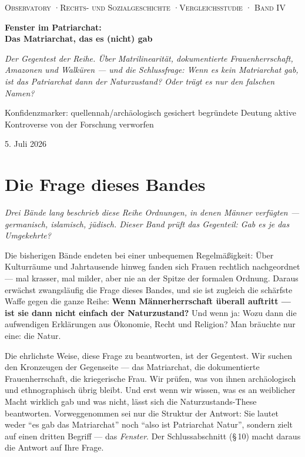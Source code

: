 \documentclass[11pt,a4paper,ngerman]{scrartcl}
\newcommand{\chipbase}[2]{\hspace{0pt}{\footnotesize\textcolor{#1}{[\textsc{#2}]}}}
\newcommand{\chipbelegt}[1]{\chipbase{chipgreen}{#1}}
\newcommand{\chipplausibel}[1]{\chipbase{chipamber}{#1}}
\newcommand{\chipumstritten}[1]{\chipbase{chipred}{#1}}
\newcommand{\chipthese}[1]{\chipbase{chipblue}{#1}}
\begin{document}
\begin{titlepage}
\centering
{\footnotesize\scshape Observatory \quad·\quad Rechts- und Sozialgeschichte \quad·\quad Vergleichsstudie · Band IV\par}
\vspace{2.5cm}
{\Huge\bfseries Fenster im Patriarchat:\\Das Matriarchat, das es (nicht) gab\par}
\vspace{1.2cm}
{\large\itshape Der Gegentest der Reihe. Über Matrilinearität, dokumentierte Frauenherrschaft, Amazonen und Walküren --- und die Schlussfrage: Wenn es kein Matriarchat gab, ist das Patriarchat dann der Naturzustand? Oder trägt es nur den falschen Namen?\par}
\vfill
{\small Konfidenzmarker: \chipbelegt{belegt} quellennah/archäologisch gesichert \quad \chipplausibel{plausibel} begründete Deutung \quad \chipumstritten{umstritten} aktive Kontroverse \quad \chipthese{widerlegt} von der Forschung verworfen\par}
\vspace{1cm}
{\large 5. Juli 2026\par}
\end{titlepage}
\tableofcontents
\clearpage

\section{Die Frage dieses Bandes}
\noindent\textit{Drei Bände lang beschrieb diese Reihe Ordnungen, in denen Männer verfügten --- germanisch, islamisch, jüdisch. Dieser Band prüft das Gegenteil: Gab es je das Umgekehrte?}
\medskip

Die bisherigen Bände endeten bei einer unbequemen Regelmäßigkeit: Über Kulturräume und Jahrtausende hinweg fanden sich Frauen rechtlich nachgeordnet --- mal krasser, mal milder, aber nie an der Spitze der formalen Ordnung. Daraus erwächst zwangsläufig die Frage dieses Bandes, und sie ist zugleich die schärfste Waffe gegen die ganze Reihe: \textbf{Wenn Männerherrschaft überall auftritt --- ist sie dann nicht einfach der Naturzustand?} Und wenn ja: Wozu dann die aufwendigen Erklärungen aus Ökonomie, Recht und Religion? Man bräuchte nur eine: die Natur.

Die ehrlichste Weise, diese Frage zu beantworten, ist der Gegentest. Wir suchen den Kronzeugen der Gegenseite --- das Matriarchat, die dokumentierte Frauenherrschaft, die kriegerische Frau. Wir prüfen, was von ihnen archäologisch und ethnographisch übrig bleibt. Und erst wenn wir wissen, was es an weiblicher Macht wirklich gab und was nicht, lässt sich die Naturzustands-These beantworten. Vorweggenommen sei nur die Struktur der Antwort: Sie lautet weder \enquote{es gab das Matriarchat} noch \enquote{also ist Patriarchat Natur}, sondern zielt auf einen dritten Begriff --- das \emph{Fenster}. Der Schlussabschnitt (§\,10) macht daraus die Antwort auf Ihre Frage.
\end{document}
